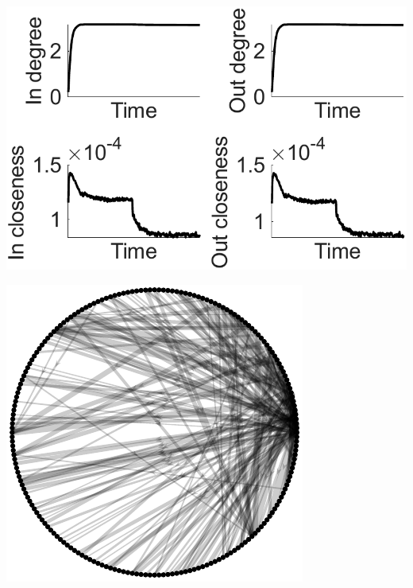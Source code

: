 \documentclass[utf8]{FrontiersinHarvard} %
\begin{document}
\begin{subfigure}
\begin{minipage}[b]{0.32\textwidth}
        \caption{}
        \label{figs:results:resource_pools}
    \end{minipage}%
\setcounter{figure}{2}
\setcounter{subfigure}{8}
    \centering
    \begin{minipage}[b]{0.32\textwidth}
        \includegraphics[width=\linewidth]{rbSTDP/digraph_measures_1.pdf}
        \caption{}
        \label{figs:results:centrality}
    \end{minipage}%
\setcounter{figure}{2}
\setcounter{subfigure}{9}
    \centering
    \begin{minipage}[b]{0.21\textwidth}
        \includegraphics[width=\linewidth]{rbSTDP/digraph_after_learning.pdf}

\end{minipage}
\end{subfigure}
\end{document}
